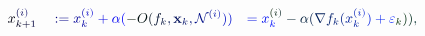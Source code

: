\documentclass[12pt]{article}
\begin{document}
\makeatletter
\renewcommand*{\@textcolor}[3]{%
  \protect\leavevmode
  \begingroup
    \color#1{#2}#3%
  \endgroup
}
\makeatother
\begin{displaymath}
\begin{array} {rlr} \displaystyle { \mathcolor[RGB]{0,0,15}{x} _ { \mathcolor[RGB]{0,0,30}{k} \mathcolor[RGB]{0,0,45}{+} \mathcolor[RGB]{0,0,60}{1} } ^ { \mathcolor[RGB]{0,0,75}{(} \mathcolor[RGB]{0,0,90}{i} \mathcolor[RGB]{0,0,105}{)} } } & \displaystyle { { } \mathcolor[RGB]{0,0,120}{:} \mathcolor[RGB]{0,0,135}{=} \mathcolor[RGB]{0,0,150}{x} _ { \mathcolor[RGB]{0,0,165}{k} } ^ { \mathcolor[RGB]{0,0,180}{(} \mathcolor[RGB]{0,0,195}{i} \mathcolor[RGB]{0,0,210}{)} } \mathcolor[RGB]{0,0,225}{+} \mathcolor[RGB]{0,0,240}{\alpha} \mathcolor[RGB]{0,0,255}{(} \mathcolor[RGB]{0,15,0}{-} \mathcolor[RGB]{0,15,15}{O} \mathcolor[RGB]{0,15,30}{(} \mathcolor[RGB]{0,15,45}{f} _ { \mathcolor[RGB]{0,15,60}{k} } \mathcolor[RGB]{0,15,75}{,} \mathbf { \mathcolor[RGB]{0,15,90}{x} } _ { \mathcolor[RGB]{0,15,105}{k} } \mathcolor[RGB]{0,15,120}{,} \mathcal { \mathcolor[RGB]{0,15,135}{N} } ^ { \mathcolor[RGB]{0,15,150}{(} \mathcolor[RGB]{0,15,165}{i} \mathcolor[RGB]{0,15,180}{)} } \mathcolor[RGB]{0,15,195}{)} \mathcolor[RGB]{0,15,210}{)} } & \displaystyle { \mathcolor[RGB]{0,15,225}{=} \mathcolor[RGB]{0,15,240}{x} _ { \mathcolor[RGB]{0,15,255}{k} } ^ { \mathcolor[RGB]{0,30,0}{(} \mathcolor[RGB]{0,30,15}{i} \mathcolor[RGB]{0,30,30}{)} } \mathcolor[RGB]{0,30,45}{-} \mathcolor[RGB]{0,30,60}{\alpha} \mathcolor[RGB]{0,30,75}{(} \mathcolor[RGB]{0,30,90}{\nabla} \mathcolor[RGB]{0,30,105}{f} _ { \mathcolor[RGB]{0,30,120}{k} } \mathcolor[RGB]{0,30,135}{(} \mathcolor[RGB]{0,30,150}{x} _ { \mathcolor[RGB]{0,30,165}{k} } ^ { \mathcolor[RGB]{0,30,180}{(} \mathcolor[RGB]{0,30,195}{i} \mathcolor[RGB]{0,30,210}{)} } \mathcolor[RGB]{0,30,225}{)} \mathcolor[RGB]{0,30,240}{+} \mathcolor[RGB]{0,30,255}{\varepsilon} _ { \mathcolor[RGB]{0,45,0}{k} } \mathcolor[RGB]{0,45,15}{)} \mathcolor[RGB]{0,45,30}{)} \mathcolor[RGB]{0,45,45}{,} } \end{array}
\end{displaymath}
\end{document}
